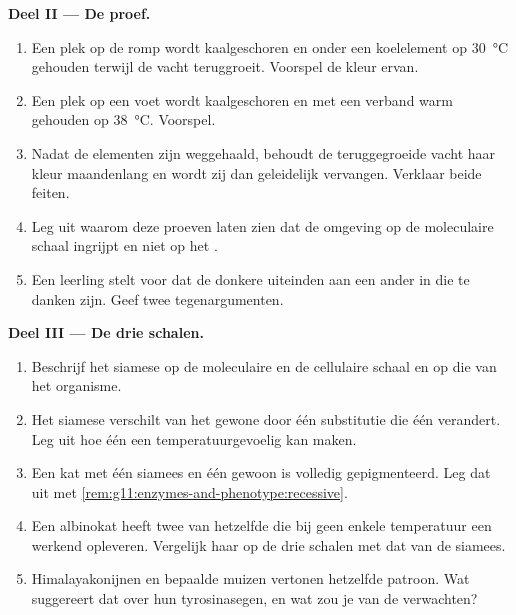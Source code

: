 \begin{problem}
\medskip
\noindent\textbf{Deel II --- De proef.}
\begin{enumerate}[resume]
  \item Een plek op de romp wordt kaalgeschoren en onder een koelelement
        op \qty{30}{\celsius} gehouden terwijl de vacht teruggroeit.
        Voorspel de kleur ervan.
  \item Een plek op een voet wordt kaalgeschoren en met een verband warm
        gehouden op \qty{38}{\celsius}. Voorspel.
  \item Nadat de elementen zijn weggehaald, behoudt de teruggegroeide
        vacht haar kleur maandenlang en wordt zij dan geleidelijk
        vervangen. Verklaar beide feiten.
  \item Leg uit waarom deze proeven laten zien dat de omgeving op de
        moleculaire schaal ingrijpt en niet op het .
  \item Een leerling stelt voor dat de donkere uiteinden aan een ander
         in die  te danken zijn. Geef twee tegenargumenten.
\end{enumerate}

\medskip
\noindent\textbf{Deel III --- De drie schalen.}
\begin{enumerate}[resume]
  \item Beschrijf het siamese  op de moleculaire en de cellulaire
        schaal en op die van het organisme.
  \item Het siamese  verschilt van het gewone door één substitutie
        die één  verandert. Leg uit hoe één  een 
        temperatuurgevoelig kan maken.
  \item Een kat met één siamees en één gewoon  is volledig
        gepigmenteerd. Leg dat uit met
        \cref{rem:g11:enzymes-and-phenotype:recessive}.
  \item Een albinokat heeft twee  van hetzelfde  die bij geen
        enkele temperatuur een werkend  opleveren. Vergelijk haar
         op de drie schalen met dat van de siamees.
  \item Himalayakonijnen en bepaalde muizen vertonen hetzelfde patroon.
        Wat suggereert dat over hun tyrosinasegen, en wat zou je van de
         verwachten?
\end{enumerate}


\end{problem}
